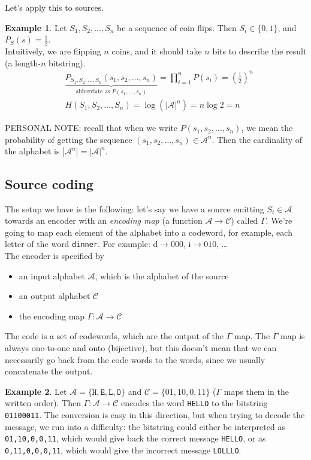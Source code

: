 \documentclass{article}
\theoremstyle{plain}
\theoremstyle{definition}
\newtheorem{exmp}{Example}
\theoremstyle{remark}
\begin{document}
Let's apply this to sources.

\begin{exmp}
	Let $S_1, S_2, \ldots, S_n$ be a sequence of coin flips. Then $S_i \in \{0, 1\}$, and $P_S(s) = \frac12$. \\
Intuitively, we are flipping $n$ coins, and it should take $n$ bits to describe the result (a length-$n$ bitstring).
\begin{align*}
	&\underbrace{P_{S_1, S_2, \ldots, S_n}(s_1, s_2, \ldots, s_n)}_{\text{abbreviate as } P(s_1, \ldots, s_n)} = \prod_{i=1}^n P(s_i) = \left(\frac12 \right)^n \\
	&H(S_1, S_2, \ldots, S_n) = \log\left(|\mathcal A|^n \right) = n \log 2 = n
\end{align*}
\end{exmp}

PERSONAL NOTE: recall that when we write $P(s_1, s_2, \ldots, s_n)$, we mean the probability of getting the sequence $(s_1, s_2, \ldots, s_n) \in \mathcal A^n$. Then the cardinality of the alphabet is $|\mathcal A^n| = |\mathcal A|^n$.

\subsection{Source coding}
The setup we have is the following: let's say we have a source emitting $S_i \in \mathcal A$ towards an encoder with an \emph{encoding map} (a function $\mathcal A \to \mathcal C$) called $\Gamma$. We're going to map each element of the alphabet into a codeword, for example, each letter of the word \texttt{dinner}. For example: d$\to 000$, i$\to 010$, \dots \\
The encoder is specified by
\begin{itemize}
	\item an input alphabet $\mathcal A$, which is the alphabet of the source
	\item an output alphabet $\mathcal C$
	\item the encoding map $\Gamma : \mathcal A \to \mathcal C$
\end{itemize}
The code is a set of codewords, which are the output of the $\Gamma$ map. The $\Gamma$ map is always one-to-one and onto (bijective), but this doesn't mean that we can necessarily go back from the code words to the words, since we usually concatenate the output.

\begin{exmp}
 Let $\mathcal A = \{\texttt H, \texttt E, \texttt L, \texttt O\}$ and $\mathcal C = \{01, 10, 0, 11\}$ ($\Gamma$ maps them in the written order). Then $\Gamma : \mathcal A \to \mathcal C$ encodes the word \texttt{HELLO} to the bitstring \texttt{01100011}. The conversion is easy in this direction, but when trying to decode the message, we run into a difficulty: the bitstring could either be interpreted as \texttt{01,10,0,0,11}, which would give back the correct message \texttt{HELLO}, or as \texttt{0,11,0,0,0,11}, which would give the incorrect message \texttt{LOLLLO}.
\end{exmp}
\end{document}

